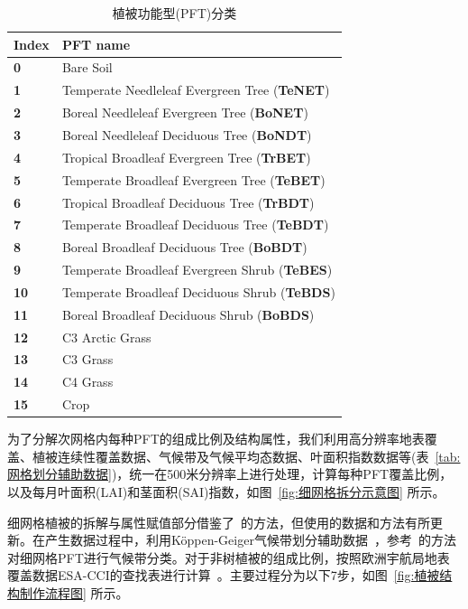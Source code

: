 \begin{table}[htbp]
\centering
\caption{植被功能型(PFT)分类}
\label{tab:PFT分类及缩写}
\begin{tabular}{l l}
\toprule
\textbf{Index} & \textbf{PFT name} \\

\midrule
\textbf{0} & Bare Soil \\
\hline
\textbf{1} & Temperate Needleleaf Evergreen Tree (\textbf{TeNET}) \\
\hline
\textbf{2} & Boreal Needleleaf Evergreen Tree (\textbf{BoNET}) \\
\hline
\textbf{3} & Boreal Needleleaf Deciduous Tree (\textbf{BoNDT}) \\
\hline
\textbf{4} & Tropical Broadleaf Evergreen Tree (\textbf{TrBET}) \\
\hline
\textbf{5} & Temperate Broadleaf Evergreen Tree (\textbf{TeBET}) \\
\hline
\textbf{6} & Tropical Broadleaf Deciduous Tree (\textbf{TrBDT}) \\
\hline
\textbf{7} & Temperate Broadleaf Deciduous Tree (\textbf{TeBDT}) \\
\hline
\textbf{8} & Boreal Broadleaf Deciduous Tree (\textbf{BoBDT}) \\
\hline
\textbf{9} & Temperate Broadleaf Evergreen Shrub (\textbf{TeBES}) \\
\hline
\textbf{10} & Temperate Broadleaf Deciduous Shrub (\textbf{TeBDS}) \\
\hline
\textbf{11} & Boreal Broadleaf Deciduous Shrub (\textbf{BoBDS}) \\
\hline
\textbf{12} & C3 Arctic Grass \\
\hline
\textbf{13} & C3 Grass \\
\hline
\textbf{14} & C4 Grass  \\
\hline
\textbf{15} & Crop \\
\bottomrule
\end{tabular}

\end{table}

为了分解次网格内每种PFT的组成比例及结构属性，我们利用高分辨率地表覆盖、植被连续性覆盖数据、气候带及气候平均态数据、叶面积指数数据等(表~\ref{tab:网格划分辅助数据})，统一在500米分辨率上进行处理，计算每种PFT覆盖比例，以及每月叶面积(LAI)和茎面积(SAI)指数，如图~\ref{fig:细网格拆分示意图} 所示。

细网格植被的拆解与属性赋值部分借鉴了~\citet{lawrence2007representing}的方法，但使用的数据和方法有所更新。在产生数据过程中，利用Köppen-Geiger气候带划分辅助数据~\citep{beck2018}，参考~\citet{poulter2011PlantFunctionalType}的方法对细网格PFT进行气候带分类。对于非树植被的组成比例，按照欧洲宇航局地表覆盖数据ESA-CCI的查找表进行计算~\citep{poulter2015PlantFunctionalType}。主要过程分为以下7步，如图~\ref{fig:植被结构制作流程图} 所示。

